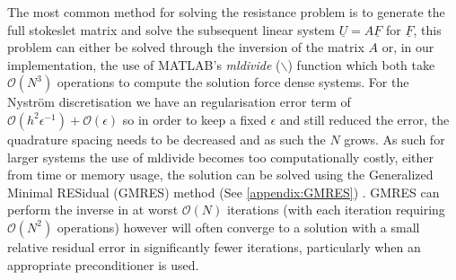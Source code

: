 The most common method for solving the resistance problem is to generate the full stokeslet matrix and solve the subsequent linear system $\underline{U} = A\underline{F}$ for $\underline{F}$, this problem can either be solved through the inversion of the matrix $A$ or, in our implementation, the use of MATLAB's \textit{mldivide} ($\backslash$) function which both take $\mathcal{O}(N^3)$ operations to compute the solution force dense systems. For the Nyström discretisation we have an regularisation error term of $\mathcal{O}(h^2\epsilon^{-1})+\mathcal{O}(\epsilon)$ so in order to keep a fixed $\epsilon$ and still reduced the error, the quadrature spacing needs to be decreased and as such the $N$ grows. As such for larger systems the use of mldivide becomes too computationally costly, either from time or memory usage, the solution can be solved using the Generalized Minimal RESidual (GMRES) method (See \cref{appendix:GMRES}) \cite{Saad1986GMRES:Systems,Elman2005FiniteDynamics}. GMRES can perform the inverse in at worst $\mathcal{O}(N)$ iterations (with each iteration requiring $\mathcal{O}(N^2)$ operations) however will often converge to a solution with a small relative residual error in significantly fewer iterations, particularly when an appropriate preconditioner is used. 